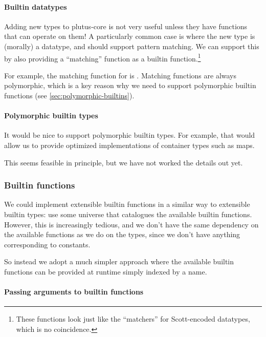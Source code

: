 \paragraph{Builtin datatypes}

Adding new types to \gls{plutus-core} is not very useful unless they have functions that can operate on them!
A particularly common case is where the new type is (morally) a datatype, and should support pattern matching.
We can support this by also providing a ``matching'' function as a builtin function.\footnote{
  These functions look just like the ``matchers'' for Scott-encoded datatypes, which is no coincidence.
}

For example, the matching function for  is .
Matching functions are always polymorphic, which is a key reason why we need to support polymorphic builtin functions (see \cref{sec:polymorphic-builtins}).

\paragraph{Polymorphic builtin types}

It would be nice to support polymorphic builtin types.
For example, that would allow us to provide optimized implementations of container types such as maps.

This seems feasible in principle, but we have not worked the details out yet.

\subsubsection{Builtin functions}

We could implement extensible builtin functions in a similar way to extensible builtin types: use some universe that catalogues the available builtin functions.
However, this is increasingly tedious, and we don't have the same dependency on the available functions as we do on the types, since we don't have anything corresponding to constants.

So instead we adopt a much simpler approach where the available builtin functions can be provided at runtime simply indexed by a name.

\paragraph{Passing arguments to builtin functions}

